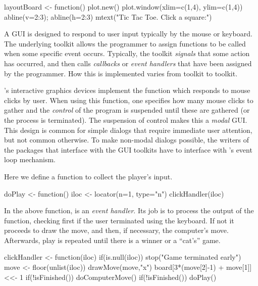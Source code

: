 \begin{Schunk}
\begin{Sinput}
 layoutBoard <- function() {
   plot.new()
   plot.window(xlim=c(1,4), ylim=c(1,4))
   abline(v=2:3);  abline(h=2:3)
   mtext("Tic Tac Toe. Click a square:")
 }
\end{Sinput}
\end{Schunk}

A GUI is designed to respond to user input typically by the mouse or
keyboard. The underlying toolkit allows the programmer to assign
functions to be called when some specific event occurs. Typically, the
toolkit \textit{signals} that some action has occurred, and then
calls \textit{callbacks} or \textit{event handlers} that have been
assigned by the programmer. How this is implemented varies from
toolkit to toolkit.

\R's interactive graphics devices implement the 
function which responds to mouse clicks by user. When using this function,
one specifies how many mouse clicks to gather and the \textit{control}
of the program is suspended until these are gathered (or the process
is terminated). The suspension of control makes this a \textit{modal}
GUI. This design is common for simple dialogs that require immediate
user attention, but not common otherwise. To make non-modal dialogs
possible, the writers of the \R\/ packages that interface with the GUI
toolkits have to interface with \R's event loop mechanism.


Here we define a function to collect the player's input.
\begin{Schunk}
\begin{Sinput}
 doPlay <- function() {
   iloc <- locator(n=1, type="n")
   clickHandler(iloc)
 }
\end{Sinput}
\end{Schunk}

In the above function,
 is an \textit{event handler}. Its job is to process the output of the
 function, checking first if the user terminated
 using the keyboard. If not it proceeds to draw the
move, and then, if necessary, the computer's move. Afterwards, play is
repeated until there is a winner or a ``cat's'' game. 


\begin{Schunk}
\begin{Sinput}
 clickHandler <- function(iloc) {
   if(is.null(iloc)) 
     stop("Game terminated early")
   move <- floor(unlist(iloc))
   drawMove(move,"x")
   board[3*(move[2]-1) + move[1]] <<- 1
   if(!isFinished()) 
     doComputerMove()
   if(!isFinished()) 
     doPlay()
 }
\end{Sinput}
\end{Schunk}

